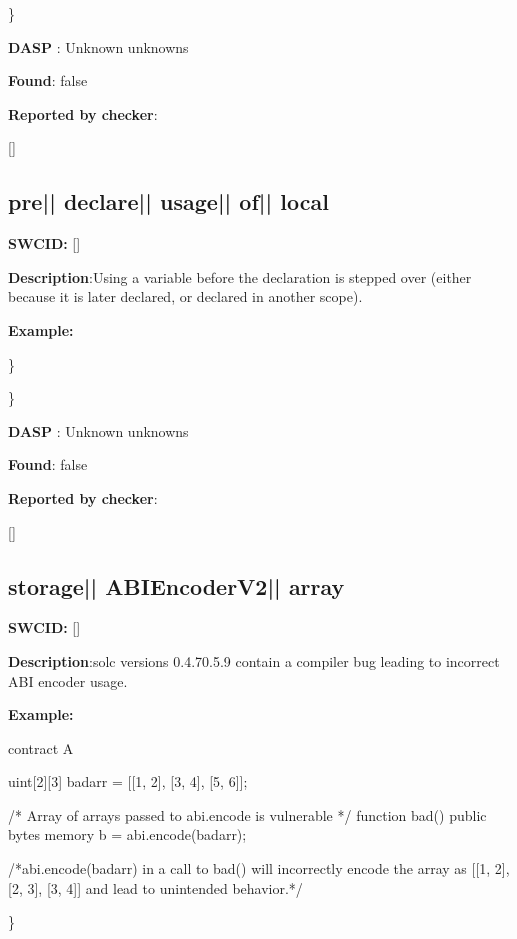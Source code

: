 \documentclass{article}
\begin{document}
\} 

\textbf{DASP} : Unknown unknowns

\textbf{Found}: false

\textbf{Reported by checker}: 
\begin{ffcode} 

[]
\end{ffcode} 
\subsection{pre{|\textunderscore| }declare{|\textunderscore| }usage{|\textunderscore| }of{|\textunderscore| }local} 
\textbf{SWC{\textunderscore }ID:} []

\textbf{Description}:Using a variable before the declaration is stepped over (either because it is later declared, or declared in another scope).


\textbf{Example:} 
\} 

\} 

\textbf{DASP} : Unknown unknowns

\textbf{Found}: false

\textbf{Reported by checker}: 
\begin{ffcode} 

[]
\end{ffcode} 
\subsection{storage{|\textunderscore| }ABIEncoderV2{|\textunderscore| }array} 
\textbf{SWC{\textunderscore }ID:} []

\textbf{Description}:solc versions 0.4.7{\textendash}0.5.9 contain a compiler bug leading to incorrect ABI encoder usage.


\textbf{Example:} 
\begin{ffcode} 

contract A {
    uint[2][3] bad\textunderscore arr = [[1, 2], [3, 4], [5, 6]];

    /* Array of arrays passed to abi.encode is vulnerable */
    function bad() public {
        bytes memory b = abi.encode(bad\textunderscore arr);
    }
}

 /*abi.encode(bad\textunderscore arr) in a call to bad() will incorrectly encode the array as [[1, 2], [2, 3], [3, 4]] and lead to unintended behavior.*/ 

\end{ffcode} 
\} 
\end{document}
